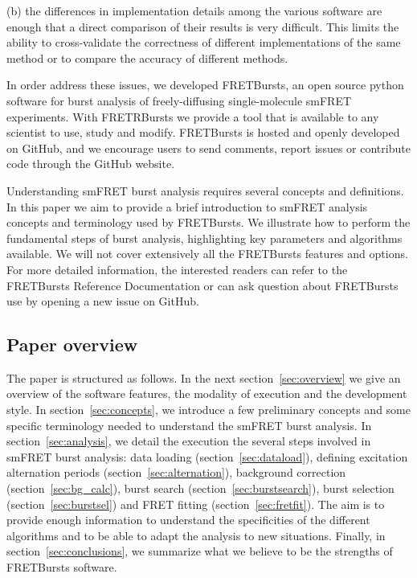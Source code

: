 (b) the differences in implementation details among the various software
are enough that a direct comparison of their results is very difficult. 
This limits the ability to cross-validate the correctness of different 
implementations of the same method or to compare the accuracy 
of different methods.

In order address these issues, we developed FRETBursts, 
an open source python software for burst analysis of freely-diffusing
single-molecule smFRET experiments. 
With FRETRBursts we provide a tool that is available to any scientist
to use, study and modify. 
FRETBursts is hosted and openly developed~\cite{Prli__2012} on GitHub, 
and we encourage users to send comments, report issues or contribute code
through the GitHub website.

Understanding smFRET burst analysis requires several concepts and definitions.
In this paper we aim to provide a brief introduction to smFRET analysis concepts
and terminology used by FRETBursts. We illustrate how to perform
the fundamental steps of burst analysis, highlighting key parameters
and algorithms available. We will not cover extensively all the FRETBursts
features and options. For more detailed information, the interested readers can refer
to the FRETBursts Reference Documentation or can ask question about FRETBursts use by opening 
a new issue on GitHub.

\subsection{Paper overview}

The paper is structured as follows.
In the next section~\ref{sec:overview} we give an overview of the software features,
the modality of execution and the development style.
In section~\ref{sec:concepts}, we
introduce a few preliminary concepts and some specific terminology needed
to understand the smFRET burst analysis.
In section~\ref{sec:analysis}, we detail the execution the several steps involved
in smFRET burst analysis: data loading (section~\ref{sec:dataload}), defining
excitation alternation periods (section~\ref{sec:alternation}), background
correction (section~\ref{sec:bg_calc}), burst search (section~\ref{sec:burstsearch}),
burst selection (section~\ref{sec:burstsel}) and FRET fitting (section~\ref{sec:fretfit}).
The aim is to provide enough information to understand the specificities of
the different algorithms and to be able to adapt the analysis to new situations.
Finally, in section~\ref{sec:conclusions}, we summarize what we believe to be
the strengths of FRETBursts software.

